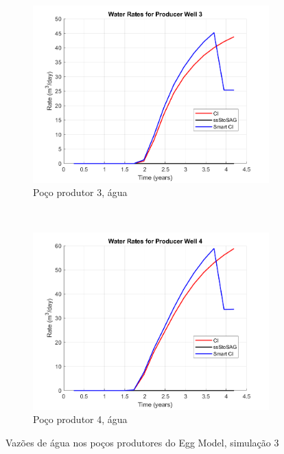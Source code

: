 \begin{figure}[!ht]
	\begin{subfigure}[b]{.3\textwidth}
		\includegraphics[width=\textwidth]{figs/resultadosEgg/imgsim3/EGG_WaterWell3_Zoom}
		\caption{Po\c{c}o produtor 3, \'{a}gua}
		\label{EGG3_WaterWell3}
	\end{subfigure}
	~
	\begin{subfigure}[b]{.3\textwidth}
		\includegraphics[width=\textwidth]{figs/resultadosEgg/imgsim3/EGG_WaterWell4_Zoom}
		\caption{Po\c{c}o produtor 4, \'{a}gua}
		\label{EGG3_WaterWell4}
	\end{subfigure}
	\caption{Vaz\~{o}es de \'{a}gua nos po\c{c}os produtores do Egg Model, simula\c{c}\~{a}o 3}
	\label{EGG3_WaterRates}
\end{figure}

